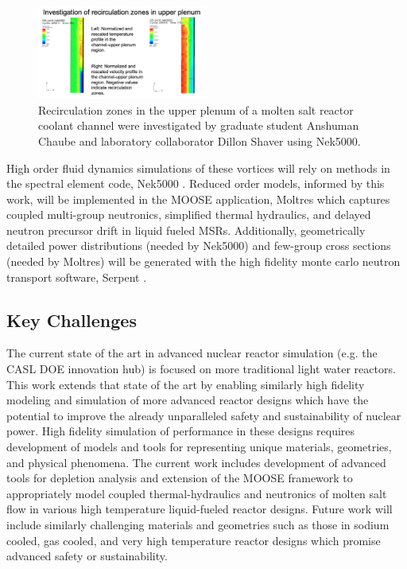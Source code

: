 \documentclass[letterpaper]{article}
\begin{document}
\begin{figure}[htb]
        \begin{center}
                \includegraphics[width=0.5\textwidth]{chaube-nek.png}
        \end{center}
        \caption{Recirculation zones in the upper plenum of a molten salt 
        reactor coolant channel were investigated by graduate student Anshuman 
        Chaube and laboratory collaborator Dillon Shaver using Nek5000. }
        \label{fig:chaube-nek}
\end{figure}



High order fluid dynamics simulations of these vortices will rely on methods in the spectral element code, Nek5000
\cite{fischer_petascale_2008}. Reduced order models, informed by this work,
will be implemented in the MOOSE \cite{gaston_parallel_2009} application, Moltres
\cite{lindsay_introduction_2018} which captures coupled multi-group neutronics,
simplified thermal hydraulics, and delayed neutron precursor drift in liquid 
fueled MSRs.
Additionally, geometrically detailed power
distributions (needed by Nek5000) and few-group cross sections (needed by
Moltres) will be generated with the high fidelity monte carlo neutron transport
software, Serpent \cite{leppanen_serpent_2014}.

\subsection{Key Challenges}
The current state of the art in advanced nuclear reactor simulation (e.g. the
CASL DOE innovation hub) is focused on more traditional light water reactors.
This work extends that state of the art by enabling similarly high fidelity
modeling and simulation of more advanced reactor designs which have the
potential to improve the already unparalleled safety and sustainability of
nuclear power. High fidelity simulation of performance in these designs
requires development of models and tools for representing unique materials,
geometries, and physical phenomena.  The current work includes development of 
advanced tools for depletion analysis and extension of the
MOOSE framework to appropriately model coupled thermal-hydraulics and
neutronics of molten salt flow in various high temperature liquid-fueled reactor
designs. Future work will include similarly challenging materials and geometries
such as those in sodium cooled, gas cooled, and very high temperature reactor
designs which promise advanced safety or sustainability.
\end{document}
